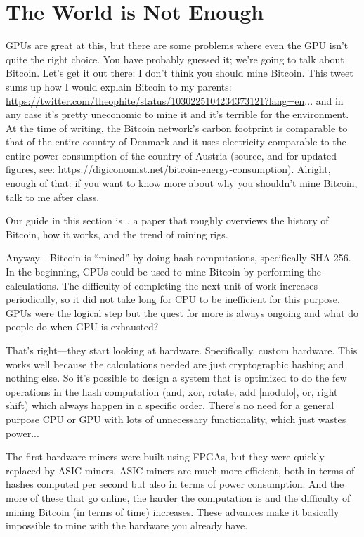 \documentclass[a4paper]{report}
\begin{document}
\section*{The World is Not Enough}
GPUs are great at this, but there are some problems where even the GPU isn't quite the right choice. You have probably guessed it; we're going to talk about Bitcoin. Let's get it out there: I don't think you should mine Bitcoin. This tweet sums up how I would explain Bitcoin to my parents: \url{https://twitter.com/theophite/status/1030225104234373121?lang=en}... and in any case it's pretty uneconomic to mine it and it's terrible for the environment. At the time of writing, the Bitcoin network's carbon footprint is comparable to that of the entire country of Denmark and it uses electricity comparable to the entire power consumption of the country of Austria (source, and for updated figures, see: \url{https://digiconomist.net/bitcoin-energy-consumption}). Alright, enough of that: if you want to know more about why you shouldn't mine Bitcoin, talk to me after class. 

Our guide in this section is~\cite{bitcoin}, a paper that roughly overviews the history of Bitcoin, how it works, and the trend of mining rigs. 

Anyway---Bitcoin is ``mined'' by doing hash computations, specifically SHA-256. In the beginning, CPUs could be used to mine Bitcoin by performing the calculations. The difficulty of completing the next unit of work increases periodically, so it did not take long for CPU to be inefficient for this purpose. GPUs were the logical step but the quest for more is always ongoing and what do people do when GPU is exhausted?

That's right---they start looking at hardware. Specifically, custom hardware. This works well because the calculations needed are just cryptographic hashing and nothing else. So it's possible to design a system that is optimized to do the few operations in the hash computation (and, xor, rotate, add [modulo], or, right shift) which always happen in a specific order. There's no need for a general purpose CPU or GPU with lots of unnecessary functionality, which just wastes power...

 The first hardware miners were built using FPGAs, but they were quickly replaced by ASIC miners. ASIC miners are much more efficient, both in terms of hashes computed per second but also in terms of power consumption. And the more of these that go online, the harder the computation is and the difficulty of mining Bitcoin (in terms of time) increases. These advances make it basically impossible to mine with the hardware you already have.
\end{document}
